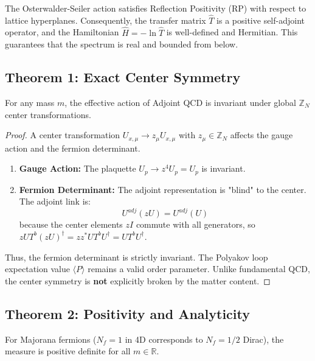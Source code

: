\begin{proposition}
The Osterwalder-Seiler action satisfies Reflection Positivity (RP) with respect to lattice hyperplanes. Consequently, the transfer matrix $\hat{T}$ is a positive self-adjoint operator, and the Hamiltonian $\hat{H} = -\ln \hat{T}$ is well-defined and Hermitian. This guarantees that the spectrum is real and bounded from below.
\end{proposition}

\subsection{Theorem 1: Exact Center Symmetry}
\begin{theorem}
\label{thm:adjoint-center}
For any mass $m$, the effective action of Adjoint QCD is invariant under global $\mathbb{Z}_N$ center transformations.
\end{theorem}

\begin{proof}
A center transformation $U_{x,\mu} \to z_\mu U_{x,\mu}$ with $z_\mu \in \mathbb{Z}_N$ affects the gauge action and the fermion determinant.
\begin{enumerate}
    \item \textbf{Gauge Action:} The plaquette $U_p \to z^4 U_p = U_p$ is invariant.
    \item \textbf{Fermion Determinant:} The adjoint representation is "blind" to the center. The adjoint link is:
    \[ U^{adj}(zU) = U^{adj}(U) \]
    because the center elements $zI$ commute with all generators, so $z U T^b (z U)^\dagger = z z^* U T^b U^\dagger = U T^b U^\dagger$.
\end{enumerate}
Thus, the fermion determinant is strictly invariant. The Polyakov loop expectation value $\langle P \rangle$ remains a valid order parameter. Unlike fundamental QCD, the center symmetry is \textbf{not} explicitly broken by the matter content.
\end{proof}

\subsection{Theorem 2: Positivity and Analyticity}
\begin{theorem}
\label{thm:adjoint-positivity}
\label{thm:lee-yang-adjoint}
For Majorana fermions ($N_f=1$ in 4D corresponds to $N_f=1/2$ Dirac), the measure is positive definite for all $m \in \mathbb{R}$.
\end{theorem}

